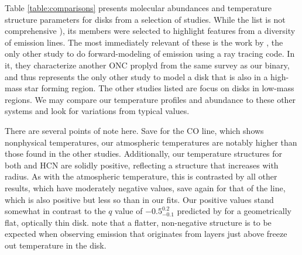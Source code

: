 

Table \ref{table:comparisons} presents molecular abundances and temperature structure parameters for disks from a selection of studies. While the list is not comprehensive \citep[see ][for more example]{Panic2008,Panic2010,Hughes2008,Qi2003,Qi2004,Isella2007}), its members were selected to highlight features from a diversity of emission lines. The most immediately relevant of these is the work by \citet{Factor2017}, the only other study to do forward-modeling of emission using a ray tracing code. In it, they characterize another ONC proplyd from the same survey as our binary, and thus represents the only other study to model a disk that is also in a high-mass star forming region. The other studies listed are focus on disks in low-mass regions. We may compare our temperature profiles and abundance to these other systems and look for variations from typical values.

There are several points of note here. Save for the CO line, which shows nonphysical temperatures, our atmospheric temperatures are notably higher than those found in the other studies. Additionally, our temperature structures for both \hco and HCN are solidly positive, reflecting a structure that increases with radius. As with the atmospheric temperature, this is contrasted by all other results, which have moderately negative values, save again for that of the \citet{Factor2017} \hco line, which is also positive but less so than in our fits. Our positive values stand somewhat in contrast to the $q$ value of $-0.5_{-0.1}^{0.2}$ predicted by \citet{Dartois2003} for a geometrically flat, optically thin disk. \citet{Schwarz2016} note that a flatter, non-negative structure is to be expected when observing emission that originates from layers just above freeze out temperature in the disk.

